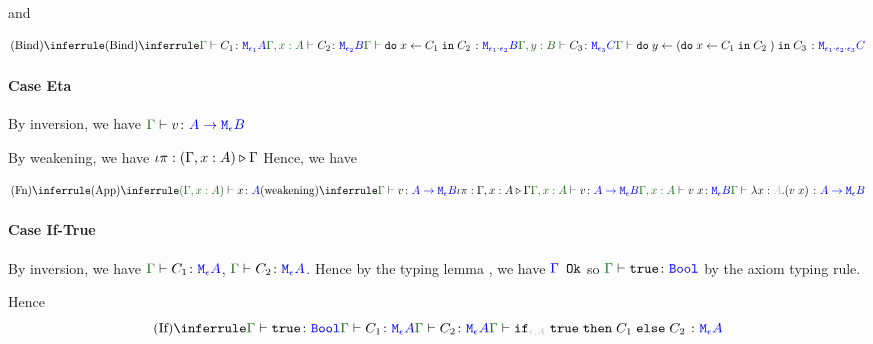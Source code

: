 {    and 

    \begin{equation}
        \ntreeruleII{Bind}{
            \ntreeruleII{Bind}{
                \gtyperelation{C_1}{\M{\e_1}{A}}
            }{
                \typerelation{\gax}{C_2}{\M{\e_2}{B}}
            } {
                \gtyperelation{\doin{x}{C_1}{C_2}}{\M{\e_1\dot\e_2}{B}}
            }
        }{
            \typerelation{\gby}{C_3}{\M{\e_3}{C}}
        }{
            \gtyperelation{\doin{y}{(\doin{x}{C_1}{C_2})}{C_3}}{\M{\e_1\dot\e_2\dot\e_3}{C}}
        }
    \end{equation}

    \paragraph{Case Eta}
    By inversion, we have $\gtyperelation{v}{\aeb}$

    By weakening, we have $\iota\pi : (\Gamma, x: A) \triangleright \Gamma$
    Hence, we have

    \begin{equation}
        \ntreeruleI{Fn}{
            \ntreeruleII{App}{
                \typerelation{(\gax)}{x}{A}
            }{
                \ntreeruleII{weakening}{
                    \gtyperelation{v}{\aeb}
                }{
                    \wrel{\i\pi}{\gax}{\G}
                }{
                    \typerelation{\gax}{v}{\aeb}
                }
            } {
                \typerelation{\gax}{\apply{v}{x}}{\meb}
            }
        }{\gtyperelation{\lam{x}{A}{(\apply{v}{x})}}{\aeb}}
    \end{equation}

    \paragraph{Case If-True}
        By inversion, we have $\gtyperelation{C_1}{\mea}$, $\gtyperelation{C_2}{\mea}$. Hence by the typing lemma , we have ${\color{blue} \Gamma} \texttt{ Ok}$ so $\gtyperelation{\t}{\B}$ by the axiom typing rule.

        Hence 
        \begin{equation}
                \ntreeruleIII{If}{
                    \gtyperelation{\t}{\B}
                }{
                    \gtyperelation{C_1}{\mea}
                }{
                    \gtyperelation{C_2}{\mea}
                }{
                    \gtyperelation{\ifthenelse{\e}{A}{\t}{C_1}{C_2}}{\mea}
                }
        \end{equation}
}
